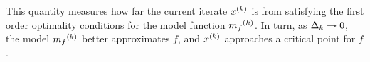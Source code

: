 \documentclass{article}
\begin{document}
This quantity measures how far the current iterate $x^{(k)}$ is from satisfying the first order optimality conditions for the model function ${{m}_f}^{(k)}$.
In turn, as $\Delta_k \to 0$, the model ${{m}_f}^{(k)}$ better approximates $f$,  and $x^{(k)}$ approaches a critical point for $f$.





%
%
%











%
\end{document}
